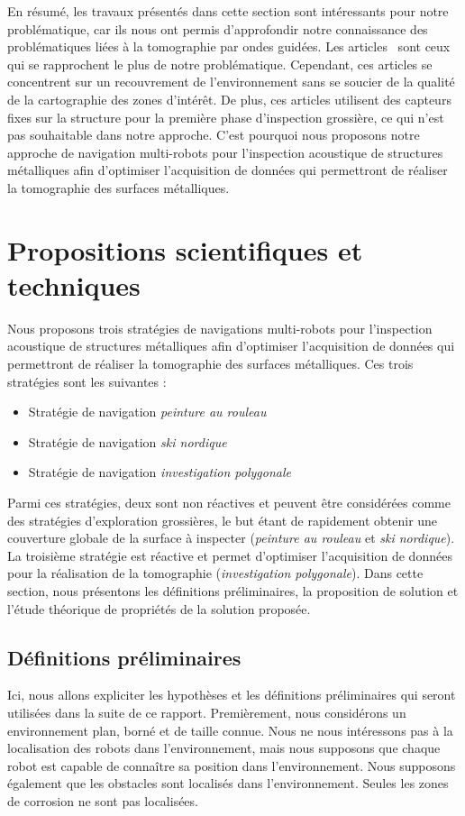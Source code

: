 \documentclass[francais,RandD]{rapportPFE}
\begin{document}
		En résumé, les travaux présentés dans cette section sont intéressants pour notre problématique, car ils nous ont permis d'approfondir notre connaissance des problématiques liées à la tomographie par ondes guidées.
		Les articles~\cite{7487624, 7139673} sont ceux qui se rapprochent le plus de notre problématique.
		Cependant, ces articles se concentrent sur un recouvrement de l'environnement sans se soucier de la qualité de la cartographie des zones d'intérêt.
		De plus, ces articles utilisent des capteurs fixes sur la structure pour la première phase d'inspection grossière, ce qui n'est pas souhaitable dans notre approche.
		C'est pourquoi nous proposons notre approche de navigation multi-robots pour l'inspection acoustique de structures métalliques afin d'optimiser l'acquisition de données qui permettront de réaliser la tomographie des surfaces métalliques.
	\section{Propositions scientifiques et techniques}
		Nous proposons trois stratégies de navigations multi-robots pour l'inspection acoustique de structures métalliques afin d'optimiser l'acquisition de données qui permettront de réaliser la tomographie des surfaces métalliques. Ces trois stratégies sont les suivantes :
		\begin{itemize}
			\item Stratégie de navigation \textit{peinture au rouleau}
			\item Stratégie de navigation \textit{ski nordique}
			\item Stratégie de navigation \textit{investigation polygonale}
		\end{itemize}
		Parmi ces stratégies, deux sont non réactives et peuvent être considérées comme des stratégies d'exploration grossières, le but étant de rapidement obtenir une couverture globale de la surface à inspecter (\textit{peinture au rouleau} et \textit{ski nordique}).
		La troisième stratégie est réactive et permet d'optimiser l'acquisition de données pour la réalisation de la tomographie (\textit{investigation polygonale}).
		Dans cette section, nous présentons les définitions préliminaires, la proposition de solution et l'étude théorique de propriétés de la solution proposée.
		\subsection{Définitions préliminaires}\label{sec:definitions}
			Ici, nous allons expliciter les hypothèses et les définitions préliminaires qui seront utilisées dans la suite de ce rapport.
			Premièrement, nous considérons un environnement plan, borné et de taille connue.
			Nous ne nous intéressons pas à la localisation des robots dans l'environnement, mais nous supposons que chaque robot est capable de connaître sa position dans l'environnement.
			Nous supposons également que les obstacles sont localisés dans l'environnement.
			Seules les zones de corrosion ne sont pas localisées.
\end{document}

